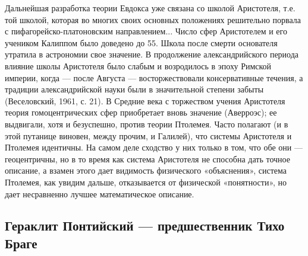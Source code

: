 Дальнейшая разработка теории Евдокса уже связана со школой Аристотеля,
т.е.  той   школой,  которая  во  многих   своих  основных  положениях
решительно порвала  с пифагорейско-платоновским  направлением... Число
сфер Аристотелем  и его учеником  Калиппом было доведено до  55. Школа
после  смерти  основателя  утратила  в  астрономии  свое  значение.  В
продолжение  александрийского периода  влияние  школы Аристотеля  было
слабым  и  возродилось  в  эпоху  Римской  империи,  когда  ---  после
Августа  ---  восторжествовали   консервативные  течения,  а  традиции
александрийской науки были в значительной степени забыты (Веселовский,
1961, с.  21). В  Средние века с  торжеством учения  Аристотеля теория
гомоцентрических  сфер  приобретает   вновь  значение  (Аверроэс);  ее
выдвигали, хотя  и безуспешно, против теории  Птолемея. Часто полагают
(и  в этой  путанице виновен,  между прочим,  и Галилей),  что системы
Аристотеля и Птолемея идентичны. На самом деле сходство у них только в
том,  что  обе  они  ---  геоцентричны, но  в  то  время  как  система
Аристотеля  не способна  дать  точное описание,  а  взамен этого  дает
видимость  физического  «объяснения»,  система  Птолемея,  как  увидим
дальше, отказывается  от физической «понятности», но  дает несравненно
лучшее математическое описание.

\subsection{Гераклит Понтийский --- предшественник Тихо Браге}

